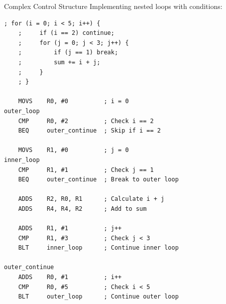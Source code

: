 \begin{example2}{Complex Control Structure}
Implementing nested loops with conditions:
\begin{lstlisting}[language=armasm, style=base]
    ; for (i = 0; i < 5; i++) {
    ;     if (i == 2) continue;
    ;     for (j = 0; j < 3; j++) {
    ;         if (j == 1) break;
    ;         sum += i + j;
    ;     }
    ; }
    
    MOVS    R0, #0          ; i = 0
outer_loop
    CMP     R0, #2          ; Check i == 2
    BEQ     outer_continue  ; Skip if i == 2
    
    MOVS    R1, #0          ; j = 0
inner_loop
    CMP     R1, #1          ; Check j == 1
    BEQ     outer_continue  ; Break to outer loop
    
    ADDS    R2, R0, R1      ; Calculate i + j
    ADDS    R4, R4, R2      ; Add to sum
    
    ADDS    R1, #1          ; j++
    CMP     R1, #3          ; Check j < 3
    BLT     inner_loop      ; Continue inner loop
    
outer_continue
    ADDS    R0, #1          ; i++
    CMP     R0, #5          ; Check i < 5
    BLT     outer_loop      ; Continue outer loop
\end{lstlisting}
\end{example2}
